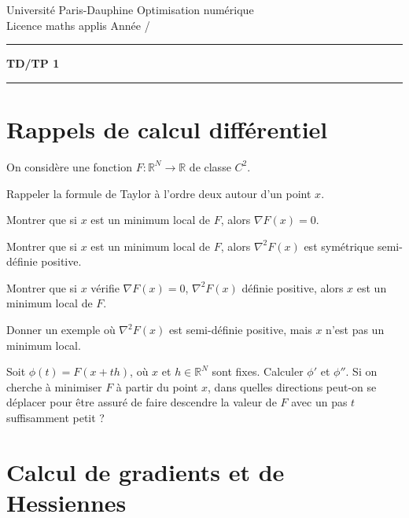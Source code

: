 \documentclass[12pt,a4paper,fleqn]{report}
\makeatletter
\def\cleardoublepage{\clearpage\if@twoside\ifodd\c@page\else\hbox{}\thispagestyle{empty}\newpage\fi\fi}
\newcommand{\R}{\mathbb R}
\makeatother
\begin{document}
\cleardoublepage

\noindent
Universit\'e Paris-Dauphine     \hfill      Optimisation num\'erique\\
Licence maths applis      \hfill      Ann\'ee /

\medskip

\hrule

\medskip



\begin{center}

\textbf{\huge TD/TP 1}

\smallskip

\rule{10cm}{0.4pt}

\end{center}


\section{Rappels de calcul différentiel}
\begin{exercice}
  On considère une fonction $F : \R^{N} \to \R$ de classe $C^{2}$.
  \begin{questions}
  \item Rappeler la formule de Taylor à l'ordre deux autour d'un point $x$.
  \item Montrer que si $x$ est un minimum local de $F$, alors $\nabla
    F(x) = 0$.
  \item Montrer que si $x$ est un minimum local de $F$, alors
    $\nabla^{2} F(x)$ est symétrique semi-définie positive.
  \item Montrer que si $x$ vérifie $\nabla F(x) = 0$, $\nabla^{2}
    F(x)$ définie positive, alors $x$ est un minimum local de $F$.
  \item Donner un exemple où $\nabla^{2} F(x)$ est semi-définie
    positive, mais $x$ n'est pas un minimum local.
  \end{questions}
\end{exercice}

\begin{exercice}
  Soit $\phi(t) = F(x+th)$, où $x$ et $h \in \R^{N}$ sont
  fixes. Calculer $\phi'$ et $\phi''$. Si on cherche à minimiser $F$
  à partir du point $x$, dans quelles directions peut-on se déplacer
  pour être assuré de faire descendre la valeur de $F$ avec un pas $t$
  suffisamment petit ?
\end{exercice}

\section{Calcul de gradients et de Hessiennes}
\end{document}
